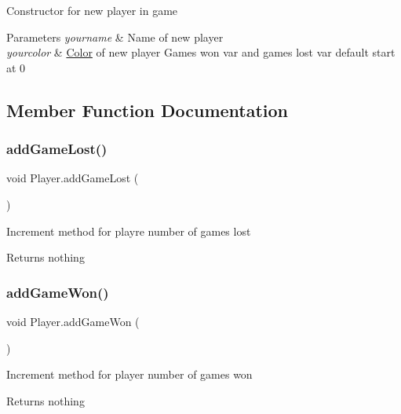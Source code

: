 Constructor for new player in game 
\begin{DoxyParams}{Parameters}
{\em yourname} & Name of new player \\
\hline
{\em yourcolor} & \mbox{\hyperlink{struct_color}{Color}} of new player Games won var and games lost var default start at 0 \\
\hline
\end{DoxyParams}


\subsection{Member Function Documentation}
\mbox{\label{class_player_a72bc43f3b577a89100f9527442f9e040}} 
\subsubsection{\texorpdfstring{addGameLost()}{addGameLost()}}
{\footnotesize\ttfamily void Player.\+add\+Game\+Lost (\begin{DoxyParamCaption}{ }\end{DoxyParamCaption})\hspace{0.3cm}{\ttfamily [inline]}}

Increment method for playre number of games lost \begin{DoxyReturn}{Returns}
nothing 
\end{DoxyReturn}
\mbox{\label{class_player_a8be574b1b809fa4655039c64ab5c36ee}} 
\subsubsection{\texorpdfstring{addGameWon()}{addGameWon()}}
{\footnotesize\ttfamily void Player.\+add\+Game\+Won (\begin{DoxyParamCaption}{ }\end{DoxyParamCaption})\hspace{0.3cm}{\ttfamily [inline]}}

Increment method for player number of games won \begin{DoxyReturn}{Returns}
nothing 
\end{DoxyReturn}
\mbox{\label{class_player_a108c087a123e224e744bf10755c1bf1e}} 
